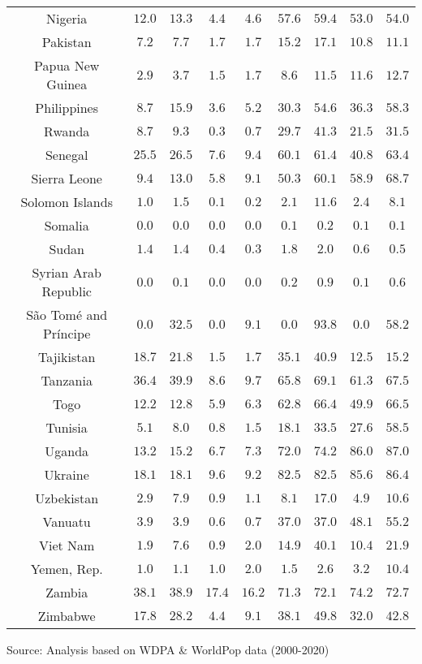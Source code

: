 \begin{longtable}{ccccccccc}
Nigeria & $12.0$ & $13.3$ & $4.4$ & $4.6$ & $57.6$ & $59.4$ & $53.0$ & $54.0$ \\ 
Pakistan & $7.2$ & $7.7$ & $1.7$ & $1.7$ & $15.2$ & $17.1$ & $10.8$ & $11.1$ \\ 
Papua New Guinea & $2.9$ & $3.7$ & $1.5$ & $1.7$ & $8.6$ & $11.5$ & $11.6$ & $12.7$ \\ 
Philippines & $8.7$ & $15.9$ & $3.6$ & $5.2$ & $30.3$ & $54.6$ & $36.3$ & $58.3$ \\ 
Rwanda & $8.7$ & $9.3$ & $0.3$ & $0.7$ & $29.7$ & $41.3$ & $21.5$ & $31.5$ \\ 
Senegal & $25.5$ & $26.5$ & $7.6$ & $9.4$ & $60.1$ & $61.4$ & $40.8$ & $63.4$ \\ 
Sierra Leone & $9.4$ & $13.0$ & $5.8$ & $9.1$ & $50.3$ & $60.1$ & $58.9$ & $68.7$ \\ 
Solomon Islands & $1.0$ & $1.5$ & $0.1$ & $0.2$ & $2.1$ & $11.6$ & $2.4$ & $8.1$ \\ 
Somalia & $0.0$ & $0.0$ & $0.0$ & $0.0$ & $0.1$ & $0.2$ & $0.1$ & $0.1$ \\ 
Sudan & $1.4$ & $1.4$ & $0.4$ & $0.3$ & $1.8$ & $2.0$ & $0.6$ & $0.5$ \\ 
Syrian Arab Republic & $0.0$ & $0.1$ & $0.0$ & $0.0$ & $0.2$ & $0.9$ & $0.1$ & $0.6$ \\ 
São Tomé and Príncipe & $0.0$ & $32.5$ & $0.0$ & $9.1$ & $0.0$ & $93.8$ & $0.0$ & $58.2$ \\ 
Tajikistan & $18.7$ & $21.8$ & $1.5$ & $1.7$ & $35.1$ & $40.9$ & $12.5$ & $15.2$ \\ 
Tanzania & $36.4$ & $39.9$ & $8.6$ & $9.7$ & $65.8$ & $69.1$ & $61.3$ & $67.5$ \\ 
Togo & $12.2$ & $12.8$ & $5.9$ & $6.3$ & $62.8$ & $66.4$ & $49.9$ & $66.5$ \\ 
Tunisia & $5.1$ & $8.0$ & $0.8$ & $1.5$ & $18.1$ & $33.5$ & $27.6$ & $58.5$ \\ 
Uganda & $13.2$ & $15.2$ & $6.7$ & $7.3$ & $72.0$ & $74.2$ & $86.0$ & $87.0$ \\ 
Ukraine & $18.1$ & $18.1$ & $9.6$ & $9.2$ & $82.5$ & $82.5$ & $85.6$ & $86.4$ \\ 
Uzbekistan & $2.9$ & $7.9$ & $0.9$ & $1.1$ & $8.1$ & $17.0$ & $4.9$ & $10.6$ \\ 
Vanuatu & $3.9$ & $3.9$ & $0.6$ & $0.7$ & $37.0$ & $37.0$ & $48.1$ & $55.2$ \\ 
Viet Nam & $1.9$ & $7.6$ & $0.9$ & $2.0$ & $14.9$ & $40.1$ & $10.4$ & $21.9$ \\ 
Yemen, Rep. & $1.0$ & $1.1$ & $1.0$ & $2.0$ & $1.5$ & $2.6$ & $3.2$ & $10.4$ \\ 
Zambia & $38.1$ & $38.9$ & $17.4$ & $16.2$ & $71.3$ & $72.1$ & $74.2$ & $72.7$ \\ 
Zimbabwe & $17.8$ & $28.2$ & $4.4$ & $9.1$ & $38.1$ & $49.8$ & $32.0$ & $42.8$ \\ 
\bottomrule
\end{longtable}
\begin{minipage}{\linewidth}
Source: Analysis based on WDPA \& WorldPop data (2000-2020)\\
\end{minipage}

